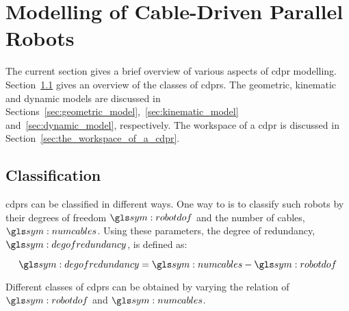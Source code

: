 \section{Modelling of Cable-Driven Parallel Robots}%
\label{sec:modelling_of_cable_driven_parallel_robots}

	The current section gives a brief overview of various aspects of \gls{cdpr}
	modelling.
	Section~\ref{sec:cdpr_classification} gives an overview of the classes of
	\glspl{cdpr}. The geometric, kinematic and dynamic models are discussed in
	Sections~\ref{sec:geometric_model},~\ref{sec:kinematic_model}
	and~\ref{sec:dynamic_model}, respectively. The workspace of a \gls{cdpr} is
	discussed in Section~\ref{sec:the_workspace_of_a_cdpr}.

    \subsection{ Classification}%
    \label{sec:cdpr_classification}

		\glspl{cdpr} can be classified in different ways.	One  way  to  is  to
		classify such robots by their degrees of  freedom  $\robotdof$	and  the
		number of cables, $\numcables$.  Using these parameters, the  degree  of
        redundancy, $\degofredundancy$, is defined as:

        \begin{equation}
            \degofredundancy = \numcables - \robotdof
        \end{equation}

		Different classes  of  \glspl{cdpr}  can  be  obtained	by	varying  the
        relation of $\robotdof$ and $\numcables$.

